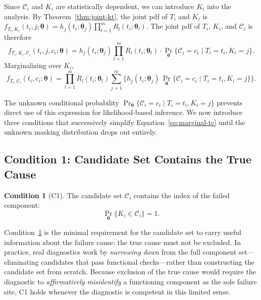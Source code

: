 \documentclass[11pt]{article}
\theoremstyle{definition}
\newtheorem{condition}{Condition}
\theoremstyle{plain}
\renewcommand{\v}[1]{\boldsymbol{#1}}
\newcommand{\btheta}{\v{\theta}}
\begin{document}
Since $\mathcal{C}_i$ and $K_i$ are statistically dependent, we can
introduce $K_i$ into the analysis.
By Theorem~\ref{thm:joint-kt}, the joint pdf of $T_i$ and $K_i$ is
$f_{T_i, K_i}(t_i, j; \btheta) = h_j(t_i; \v{\theta}_j) \prod_{l=1}^m R_l(t_i; \v{\theta}_l)$.
The joint pdf of $T_i$, $K_i$, and $\mathcal{C}_i$ is therefore
\begin{equation}
\label{eq:joint-tkc}
    f_{T_i, K_i, \mathcal{C}_i}(t_i, j, c_i; \btheta)
    = h_j(t_i; \v{\theta}_j) \prod_{l=1}^m R_l(t_i; \v{\theta}_l)
        \cdot \Pr_{\!\btheta}\{\mathcal{C}_i = c_i \mid T_i = t_i, K_i = j\}.
\end{equation}
Marginalizing over $K_i$,
\begin{equation}
\label{eq:marginal-tc}
    f_{T_i, \mathcal{C}_i}(t_i, c_i; \btheta)
    = \prod_{l=1}^m R_l(t_i; \v{\theta}_l)
        \sum_{j=1}^m \biggl\{
            h_j(t_i; \v{\theta}_j) \,
            \Pr_{\!\btheta}\{\mathcal{C}_i = c_i \mid T_i = t_i, K_i = j\}
        \biggr\}.
\end{equation}

The unknown conditional probability
$\Pr_{\!\btheta}\{\mathcal{C}_i = c_i \mid T_i = t_i, K_i = j\}$
prevents direct use of this expression for likelihood-based inference.
We now introduce three conditions that successively simplify
Equation~\eqref{eq:marginal-tc} until the unknown masking distribution
drops out entirely.

\subsection{Condition 1: Candidate Set Contains the True Cause}
\label{sec:c1}

\begin{condition}[C1]
\label{cond:c1}
The candidate set $\mathcal{C}_i$ contains the index of the failed
component:
\begin{equation}
    \Pr_{\!\btheta}\{K_i \in \mathcal{C}_i\} = 1.
\end{equation}
\end{condition}

Condition~\ref{cond:c1} is the minimal requirement for the candidate set
to carry useful information about the failure cause: the true cause must
not be excluded.
In practice, real diagnostics work by \emph{narrowing down} from the
full component set---eliminating candidates that pass functional
checks---rather than constructing the candidate set from scratch.
Because exclusion of the true cause would require the diagnostic to
\emph{affirmatively misidentify} a functioning component as the sole
failure site, C1 holds whenever the diagnostic is competent in this
limited sense.
\end{document}
